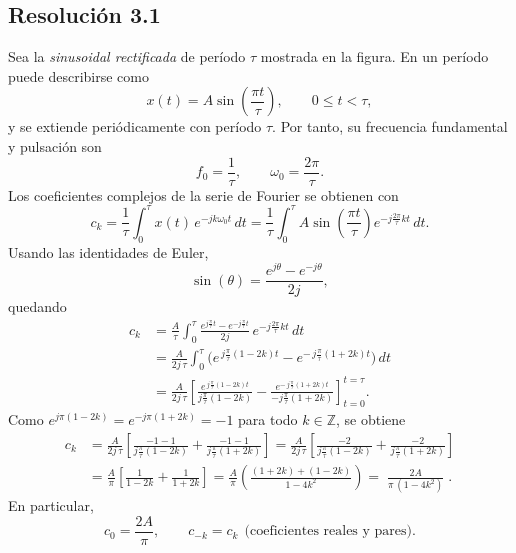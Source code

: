 \documentclass[
  11pt,
  letterpaper,
   addpoints,
   answers
  ]{exam}
\begin{document}
\begin{questions}
\begin{solution}
\subsection*{Resolución 3.1}
Sea la \emph{sinusoidal rectificada} de período \(\tau\) mostrada en la figura. En un período puede describirse como
\begin{equation}
x(t)=A\sin\!\left(\frac{\pi t}{\tau}\right),\qquad 0\le t<\tau,
\end{equation}
y se extiende periódicamente con período \(\tau\). Por tanto, su frecuencia fundamental y pulsación son
\begin{equation}
f_0=\frac{1}{\tau}, \qquad \omega_0=\frac{2\pi}{\tau}.
\end{equation}
Los coeficientes complejos de la serie de Fourier se obtienen con
\begin{equation}
c_k=\frac{1}{\tau}\int_{0}^{\tau}x(t)\,e^{-jk\omega_0 t}\,dt
=\frac{1}{\tau}\int_{0}^{\tau}A\sin\!\left(\frac{\pi t}{\tau}\right)e^{-j\frac{2\pi}{\tau}kt}\,dt.
\end{equation}
Usando las identidades de Euler,
\begin{equation}
\sin(\theta)=\frac{e^{j\theta}-e^{-j\theta}}{2j},
\end{equation}
quedando
\begin{align}
c_k
&=\frac{A}{\tau}\int_{0}^{\tau}\frac{e^{j\frac{\pi}{\tau}t}-e^{-j\frac{\pi}{\tau}t}}{2j}\,
e^{-j\frac{2\pi}{\tau}kt}\,dt \\
&=\frac{A}{2j\,\tau}\int_{0}^{\tau}
\Big(e^{\,j\frac{\pi}{\tau}(1-2k)t}-e^{-\,j\frac{\pi}{\tau}(1+2k)t}\Big)\,dt \\
&=\frac{A}{2j\,\tau}\left[
\frac{e^{\,j\frac{\pi}{\tau}(1-2k)t}}{j\frac{\pi}{\tau}(1-2k)}
-\frac{e^{-\,j\frac{\pi}{\tau}(1+2k)t}}{-j\frac{\pi}{\tau}(1+2k)}
\right]_{t=0}^{t=\tau}.
\end{align}
Como \(e^{j\pi(1-2k)}=e^{-j\pi(1+2k)}=-1\) para todo \(k\in\mathbb{Z}\), se obtiene
\begin{align}
c_k
&=\frac{A}{2j\,\tau}\left[
\frac{-1-1}{j\frac{\pi}{\tau}(1-2k)}
+\frac{-1-1}{j\frac{\pi}{\tau}(1+2k)}
\right]
=\frac{A}{2j\,\tau}\left[
\frac{-2}{j\frac{\pi}{\tau}(1-2k)}+\frac{-2}{j\frac{\pi}{\tau}(1+2k)}
\right] \\
&=\frac{A}{\pi}\left[\frac{1}{1-2k}+\frac{1}{1+2k}\right]
=\frac{A}{\pi}\left(\frac{(1+2k)+(1-2k)}{1-4k^2}\right)
=\boxed{\;\frac{2A}{\pi\,(1-4k^{2})}\;}.
\end{align}
En particular,
\begin{equation}
c_0=\frac{2A}{\pi},\qquad c_{-k}=c_k\ \ \text{(coeficientes reales y pares)}.
\end{equation}


\end{solution}
\end{questions}
\end{document}
